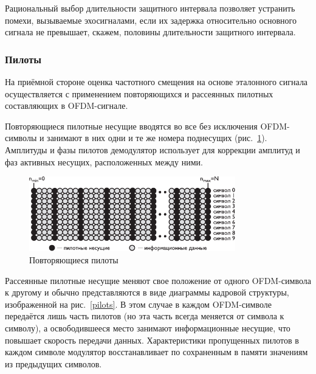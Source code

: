 
Рациональный выбор длительности защитного интервала позволяет устранить помехи, вызываемые эхосигналами, если их задержка относительно основного сигнала не превышает, скажем, половины длительности защитного интервала.



\subsubsection{Пилоты}

На приёмной стороне оценка частотного смещения на основе эталонного сигнала осуществляется с применением повторяющихся и рассеянных пилотных составляющих в OFDM-сигнале.

Повторяющиеся пилотные несущие вводятся во все без исключения OFDM-символы и занимают в них одни и те же номера поднесущих (рис.~\ref{pilots2}).
Амплитуды и фазы пилотов демодулятор использует для коррекции амплитуд и фаз активных несущих, расположенных между ними.

\begin{figure}[h]
\centering
\includegraphics[width = 0.8\textwidth]{pilots2.pdf}
\caption{Повторяющиеся пилоты}
\label{pilots2}
\end{figure}

Рассеянные пилотные несущие меняют свое положение от одного OFDM-символа к другому и обычно представляются в виде диаграммы кадровой структуры, изображенной на рис.~\ref{pilots}.
В этом случае в каждом OFDM-символе передаётся лишь часть пилотов (но эта часть всегда меняется от символа к символу), а освободившееся место занимают информационные несущие, что повышает скорость передачи данных.
Характеристики пропущенных пилотов в каждом символе модулятор восстанавливает по сохраненным в памяти значениям из предыдущих символов.

